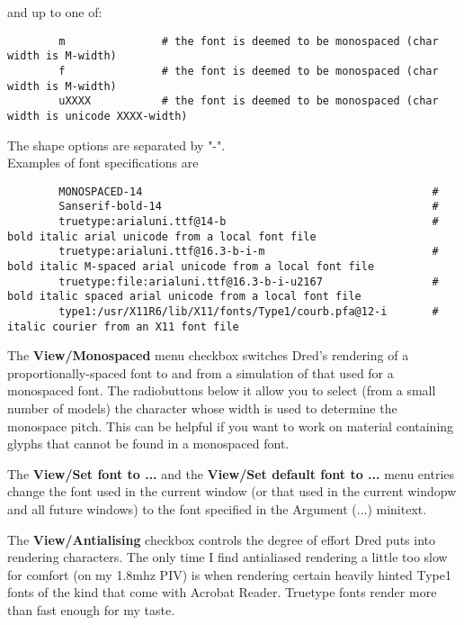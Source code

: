 \documentclass[
]{article}
\begin{document}
and up to one of:

\begin{verbatim}
        m               # the font is deemed to be monospaced (char width is M-width)
        f               # the font is deemed to be monospaced (char width is M-width)
        uXXXX           # the font is deemed to be monospaced (char width is unicode XXXX-width)
\end{verbatim}

The shape options are separated by "-".\\
Examples of font specifications are

\begin{verbatim}
        MONOSPACED-14                                             # 
        Sanserif-bold-14                                          # 
        truetype:arialuni.ttf@14-b                                # bold italic arial unicode from a local font file
        truetype:arialuni.ttf@16.3-b-i-m                          # bold italic M-spaced arial unicode from a local font file
        truetype:file:arialuni.ttf@16.3-b-i-u2167                 # bold italic spaced arial unicode from a local font file
        type1:/usr/X11R6/lib/X11/fonts/Type1/courb.pfa@12-i       # italic courier from an X11 font file
\end{verbatim}

The \textbf{View/Monospaced} menu checkbox switches Dred's rendering of
a proportionally-spaced font to and from a simulation of that used for a
monospaced font. The radiobuttons below it allow you to select (from a
small number of models) the character whose width is used to determine
the monospace pitch. This can be helpful if you want to work on material
containing glyphs that cannot be found in a monospaced font.

The \textbf{View/Set font to ...} and the \textbf{View/Set default font
to ...} menu entries change the font used in the current window (or that
used in the current windopw and all future windows) to the font
specified in the Argument (...) minitext.

The \textbf{View/Antialising} checkbox controls the degree of effort
Dred puts into rendering characters. The only time I find antialiased
rendering a little too slow for comfort (on my 1.8mhz PIV) is when
rendering certain heavily hinted Type1 fonts of the kind that come with
Acrobat Reader. Truetype fonts render more than fast enough for my
taste.

\protect\hypertarget{Preferences}{}{}
\end{document}
